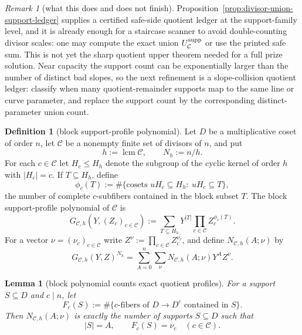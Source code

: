 \documentclass[11pt]{article}
\newtheorem{lemma}[theorem]{Lemma}
\theoremstyle{definition}
\newtheorem{definition}[theorem]{Definition}
\theoremstyle{remark}
\newtheorem{remark}[theorem]{Remark}
\begin{document}
\begin{remark}[what this does and does not finish]
\label{rem:quotient-upper-status}
Proposition~\ref{prop:divisor-union-support-ledger} supplies a certified
safe-side quotient ledger at the support-family level, and it is already enough
for a staircase scanner to avoid double-counting divisor scales: one may compute
the exact union $U_{\mathcal C}^{\rm supp}$ or use the printed safe sum.  This is
not yet the sharp quotient upper theorem needed for a full prize solution.  Near
capacity the support count can be exponentially larger than the number of
distinct bad slopes, so the next refinement is a slope-collision quotient ledger:
classify when many quotient-remainder supports map to the same line or curve
parameter, and replace the support count by the corresponding distinct-parameter
union count.
\end{remark}


\begin{definition}[block support-profile polynomial]
\label{def:block-support-profile-polynomial}
Let $D$ be a multiplicative coset of order $n$, let
$\mathcal C$ be a nonempty finite set of divisors of $n$, and put
\[
        h:=\operatorname{lcm}\mathcal C,
        \qquad N_h:=n/h .
\]
For each $c\in\mathcal C$ let $H_c\le H_h$ denote the subgroup of the cyclic
kernel of order $h$ with $|H_c|=c$.  If $T\subseteq H_h$, define
\[
        \phi_c(T):=\#\{\text{cosets }uH_c\subseteq H_h:\ uH_c\subseteq T\},
\]
the number of complete $c$-subfibers contained in the block subset $T$.
The block support-profile polynomial of $\mathcal C$ is
\[
        G_{\mathcal C,h}(Y,(Z_c)_{c\in\mathcal C})
        :=\sum_{T\subseteq H_h}
          Y^{|T|}\prod_{c\in\mathcal C}Z_c^{\phi_c(T)} .
\]
For a vector $\nu=(\nu_c)_{c\in\mathcal C}$ write
$Z^\nu:=\prod_{c\in\mathcal C}Z_c^{\nu_c}$, and define
$N_{\mathcal C,h}(A;\nu)$ by
\[
        G_{\mathcal C,h}(Y,Z)^{N_h}
        =\sum_{A=0}^{n}\sum_{\nu}
          N_{\mathcal C,h}(A;\nu)Y^A Z^\nu .
\]
\end{definition}

\begin{lemma}[block polynomial counts exact quotient profiles]
\label{lem:block-polynomial-counts-profiles}
For a support $S\subseteq D$ and $c\mid n$, let
\[
        F_c(S):=\#\{\text{$c$-fibers of }D\to D^c\text{ contained in }S\}.
\]
Then $N_{\mathcal C,h}(A;\nu)$ is exactly the number of supports
$S\subseteq D$ such that
\[
        |S|=A,
        \qquad F_c(S)=\nu_c\quad(c\in\mathcal C).
\]
\end{lemma}
\end{document}
